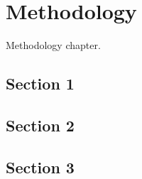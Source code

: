 \chapter{Methodology}
\label{ch:methodology}

Methodology chapter.

\newpage
\minitoc %
\newpage

\section{Section 1}

\section{Section 2}

\section{Section 3}
